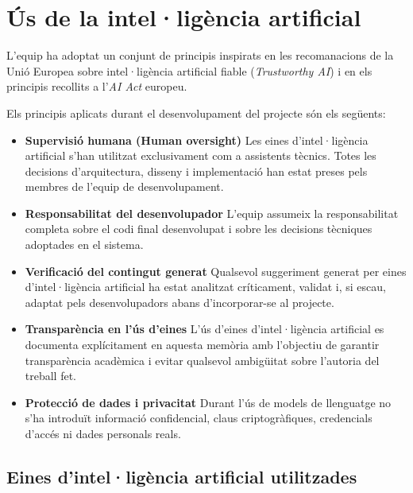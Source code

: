 

\chapter{Ús de la intel·ligència artificial}\label{ch:us-de-la-intelligencia-artificial}

L'equip ha adoptat un conjunt de principis inspirats en les recomanacions de la Unió Europea sobre intel·ligència
artificial fiable (\textit{Trustworthy AI}) i en els principis recollits a l'\textit{AI Act} europeu.

Els principis aplicats durant el desenvolupament del projecte són els següents:

\begin{itemize}

    \item \textbf{Supervisió humana (Human oversight)} Les eines d'intel·ligència artificial s'han utilitzat
    exclusivament com a assistents tècnics.
    Totes les decisions d'arquitectura, disseny i implementació han estat preses pels membres de l'equip de
    desenvolupament.

    \item \textbf{Responsabilitat del desenvolupador} L'equip assumeix la responsabilitat completa sobre el codi final
    desenvolupat i sobre les decisions tècniques adoptades en el sistema.

    \item \textbf{Verificació del contingut generat} Qualsevol suggeriment generat per eines d'intel·ligència artificial
    ha estat analitzat críticament, validat i, si escau, adaptat pels desenvolupadors abans d'incorporar-se al projecte.

    \item \textbf{Transparència en l'ús d'eines} L'ús d'eines d'intel·ligència artificial es documenta explícitament en
    aquesta memòria amb l'objectiu de garantir transparència acadèmica i evitar qualsevol ambigüitat sobre l'autoria del
    treball fet.

    \item \textbf{Protecció de dades i privacitat} Durant l'ús de models de llenguatge no s'ha introduït informació
    confidencial, claus criptogràfiques, credencials d'accés ni dades personals reals.

\end{itemize}


\section{Eines d'intel·ligència artificial utilitzades}\label{sec:eines-d'intelligencia-artificial-utilitzades}

